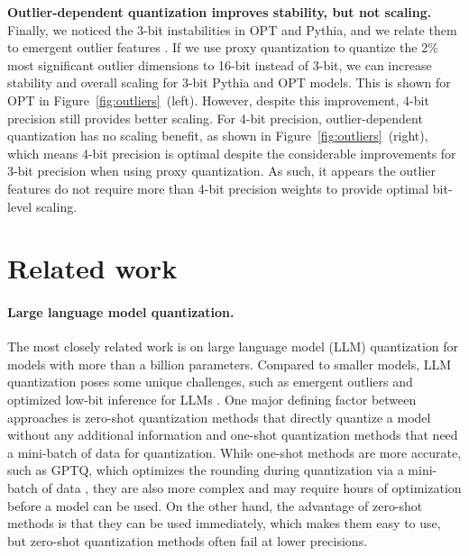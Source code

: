 \textbf{Outlier-dependent quantization improves stability, but not scaling.} Finally, we noticed the 3-bit instabilities in OPT and Pythia, and we relate them to emergent outlier features \citep{dettmers2022llm,xiao2022smoothquant}. If we use proxy quantization to quantize the 2\% most significant outlier dimensions to 16-bit instead of 3-bit, we can increase stability and overall scaling for 3-bit Pythia and OPT models. This is shown for OPT in Figure~\ref{fig:outliers}~(left). However, despite this improvement, 4-bit precision still provides better scaling. For 4-bit precision, outlier-dependent quantization has no scaling benefit, as shown in Figure~\ref{fig:outliers}~(right), which means 4-bit precision is optimal despite the considerable improvements for 3-bit precision when using proxy quantization. As such, it appears the outlier features do not require more than 4-bit precision weights to provide optimal bit-level scaling.

\section{Related work}

\paragraph{Large language model quantization.} The most closely related work is on large language model (LLM) quantization for models with more than a billion parameters. Compared to smaller models, LLM quantization poses some unique challenges, such as emergent outliers \citep{dettmers2022llm, zeng2022glm, xiao2022smoothquant} and optimized low-bit inference for LLMs \cite{frantar2022gptq,park2022nuqmm,yao2022zeroquant}. One major defining factor between approaches is zero-shot quantization methods that directly quantize a model without any additional information and one-shot quantization methods that need a mini-batch of data for quantization. While one-shot methods are more accurate, such as GPTQ, which optimizes the rounding during quantization via a mini-batch of data \citep{frantar2022gptq}, they are also more complex and may require hours of optimization before a model can be used. On the other hand, the advantage of zero-shot methods is that they can be used immediately, which makes them easy to use, but zero-shot quantization methods often fail at lower precisions. 

